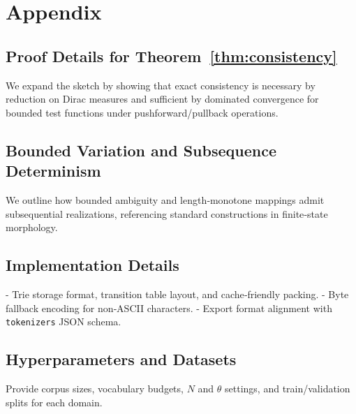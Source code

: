 \section{Appendix}



\subsection{Proof Details for Theorem~\ref{thm:consistency}}

We expand the sketch by showing that exact consistency is necessary by reduction on Dirac measures and sufficient by dominated convergence for bounded test functions under pushforward/pullback operations.

\subsection{Bounded Variation and Subsequence Determinism}

We outline how bounded ambiguity and length‑monotone mappings admit subsequential realizations, referencing standard constructions in finite‑state morphology.

\subsection{Implementation Details}

- Trie storage format, transition table layout, and cache‑friendly packing.
- Byte fallback encoding for non‑ASCII characters.
- Export format alignment with \texttt{tokenizers} JSON schema.

\subsection{Hyperparameters and Datasets}

Provide corpus sizes, vocabulary budgets, $N$ and $\theta$ settings, and train/validation splits for each domain.
